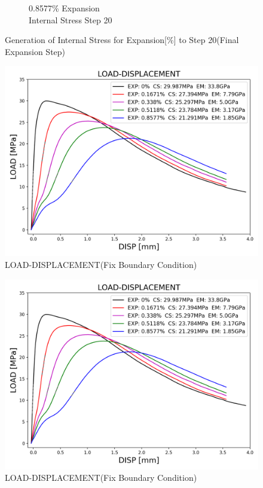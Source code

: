 \begin{figure}[ht!]
\begin{subfigure}{.25\textwidth}
      \caption{0.8577\% Expansion\\Internal Stress Step 20}
    \end{subfigure}

    


\caption{Generation of Internal Stress for Expansion[\%] to Step 20(Final Expansion Step)}
\label{fig:A30_stress}
\end{figure}

\begin{figure}[ht!]
    \centering
    \includegraphics[width=0.8\linewidth]{Files/exp_3D/DEF/S13A30FIXX-5-LOAD-DISPLACEMENT.png}
    \caption{LOAD-DISPLACEMENT(Fix Boundary Condition)}
    \label{fig:S13A15FIXX-5-LOAD-DISPLACEMENT}
\end{figure}


\begin{figure}[ht!]
    \centering
    \includegraphics[width=0.8\linewidth]{Files/exp_3D/DEF/S13A30FIXX-5-LOAD-DISPLACEMENT.png}
    \caption{LOAD-DISPLACEMENT(Fix Boundary Condition)}
    \label{fig:S13A30X-5CFIX-LOAD-DISPLACEMENT}
\end{figure}

